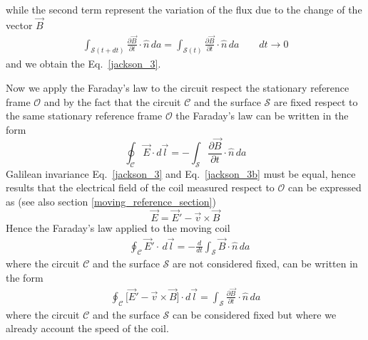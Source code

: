 \documentclass[11pt,a4paper,oneside]{book}
\numberwithin{equation}{section}
\theoremstyle{it}
\theoremstyle{definition}
\begin{document}
while the second term represent the variation of the flux due to the change of 
the vector $\vec{B}$
\begin{equation}\label{silvestrini_4}
	\begin{aligned}
		\int_{\mathcal{S}(t+dt)}\frac{\partial\vec{B}}{\partial 
		t}\cdot\hat{n}\,da = 
		\int_{\mathcal{S}(t)}\frac{\partial\vec{B}}{\partial 
		t}\cdot\hat{n}\,da\qquad dt\rightarrow0
	\end{aligned}
\end{equation}
and we obtain the Eq.~\ref{jackson_3}.

Now we apply the Faraday's law to the circuit respect the stationary reference 
frame $\mathcal{O}$ and by the fact that the circuit $\mathcal{C}$ and the 
surface $\mathcal{S}$ are fixed respect to the same stationary reference frame 
$\mathcal{O}$ the Faraday's law can be written in the form
\begin{equation}\label{jackson_3b}
	\oint_\mathcal{C}\vec{E}\cdot d\vec{l} = -\int_\mathcal {S}\frac{\partial 
	\vec{B}}{\partial t}\cdot\hat{n}\,da
\end{equation}
Galilean invariance Eq.~\ref{jackson_3} and Eq.~\ref{jackson_3b} must be equal, 
hence results that the electrical field of the coil measured respect to 
$\mathcal{O}$ can be expressed as (see also section 
\ref{moving_reference_section})
\begin{equation}\label{jackson_4}
	\boxed{	\vec{E} = \vec{E}'-\vec{v}\times\vec{B}}
\end{equation}
Hence the Faraday's law applied to the moving coil 
\begin{equation}\label{}
	\boxed{	\begin{aligned}
			&\oint_\mathcal{C} \vec{E}'\cdot\,d\vec{l}=-\frac{d}{d 
			t}\int_\mathcal{S}\vec{B}\cdot\hat{n}\,da
	\end{aligned}}
\end{equation} 
where the circuit $\mathcal{C}$ and the surface $\mathcal{S}$ are not 
considered fixed, can be written in the form
\begin{equation}\label{jackson_5}
	\boxed{ \begin{aligned} 
	\oint_\mathcal{C}\Big[\vec{E}'-\vec{v}\times\vec{B}\Big]\cdot d\vec{l} = 
	\int_\mathcal{S}\frac{\partial\vec{B}}{\partial t}\cdot\hat{n}\,da
	\end{aligned}}
\end{equation}
where the circuit $\mathcal{C}$ and the surface $\mathcal{S}$ can be considered 
fixed but where   we already account the speed of the coil.
\end{document}
